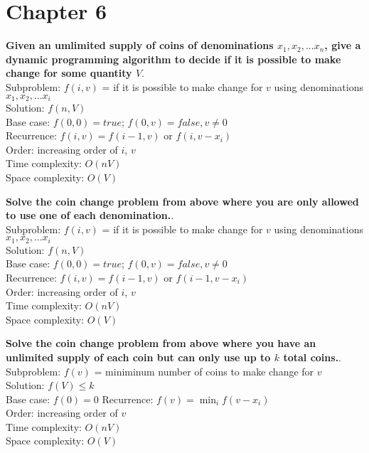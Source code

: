 \section{Chapter 6}

\begin{problem}{6.17}
    \textbf{Given an umlimited supply of coins of denominations $x_1, x_2, ... x_n$, give a dynamic programming algorithm to decide if it is possible to make change for some quantity $V$}. \\
    Subproblem: $f(i, v)$ = if it is possible to make change for $v$ using denominations $x_1, x_2, ... x_i$ \\
    Solution: $f(n, V)$ \\
    Base case: $f(0, 0) = true$; $f(0, v) = false, v \neq 0$ \\
    Recurrence: $f(i, v) = f(i - 1, v)$ or $f(i, v - x_i) $ \\
    Order: increasing order of $i$, $v$ \\
    Time complexity: $O(nV)$ \\
    Space complexity: $O(V)$
\end{problem}

\begin{problem}{6.18}
    \textbf{Solve the coin change problem from above where you are only allowed to use one of each denomination.}. \\
    Subproblem: $f(i, v)$ = if it is possible to make change for $v$ using denominations $x_1, x_2, ... x_i$ \\
    Solution: $f(n, V)$ \\
    Base case: $f(0, 0) = true$; $f(0, v) = false, v \neq 0$ \\
    Recurrence: $f(i, v) = f(i - 1, v)$ or $f(i - 1, v - x_i) $ \\
    Order: increasing order of $i$, $v$ \\
    Time complexity: $O(nV)$ \\
    Space complexity: $O(V)$
\end{problem}

\begin{problem}{6.19}
    \textbf{Solve the coin change problem from above where you have an unlimited supply of each coin but can only use up to $k$ total coins.}. \\
    Subproblem: $f(v)$ = miniminum number of coins to make change for $v$ \\
    Solution: $f(V) \leq k$ \\
    Base case: $f(0) = 0$
    Recurrence: $f(v) = \min_{i}f(v - x_i)$ \\
    Order: increasing order of $v$ \\
    Time complexity: $O(nV)$ \\
    Space complexity: $O(V)$
\end{problem}

